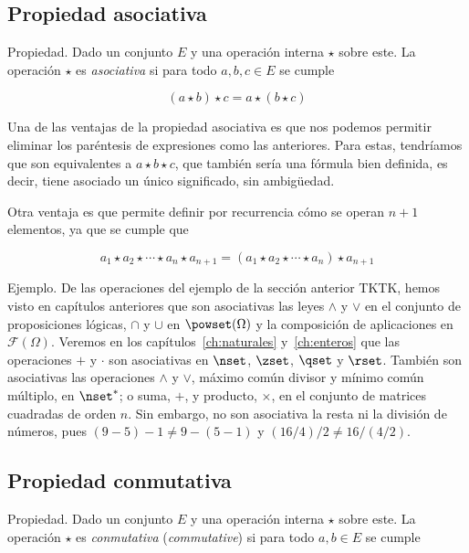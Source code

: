 





\subsection{Propiedad asociativa}

Propiedad. Dado un conjunto $E$ y una operación interna $\star$ sobre este.
La operación $\star$ es \emph{asociativa} si para todo $a, b, c \in E$ se
cumple

$$ (a \star b) \star c = a \star (b \star c) $$

Una de las ventajas de la propiedad asociativa es que nos podemos permitir
eliminar los paréntesis de expresiones como las anteriores. Para estas,
tendríamos que son equivalentes a $a \star b \star c$, que también sería una
fórmula bien definida, es decir, tiene asociado un único significado, sin
ambigüedad.

Otra ventaja es que permite definir por recurrencia cómo se operan $n + 1$
elementos, ya que se cumple que

$$ a_1 \star a_2 \star \cdots \star a_n \star a_{n+1} = (a_1 \star a_2 \star
\cdots \star a_n) \star a_{n+1} $$

Ejemplo. De las operaciones del ejemplo de la sección anterior TKTK, hemos
visto en capítulos anteriores que son asociativas las leyes $\land$ y $\lor$
en el conjunto de proposiciones lógicas, $\cap$ y $\cup$ en
$\powset(\Omega)$ y la composición de aplicaciones en $\mathcal{F}(\Omega)$.
Veremos en los capítulos~\ref{ch:naturales} y~\ref{ch:enteros} que las
operaciones $+$ y $\cdot$ son asociativas en $\nset$, $\zset$, $\qset$ y
$\rset$. También son asociativas las operaciones $\land$ y $\lor$, máximo
común divisor y mínimo común múltiplo, en $\nset^*$; o suma, $+$, y
producto, $\times$, en el conjunto de matrices cuadradas de orden $n$. Sin
embargo, no son asociativa la resta ni la división de números, pues $(9 - 5)
- 1 \neq 9 - (5 - 1)$ y $(16/4)/2 \neq 16/(4/2)$.




\subsection{Propiedad conmutativa}

Propiedad. Dado un conjunto $E$ y una operación interna $\star$ sobre este.
La operación $\star$ es \emph{conmutativa} (\emph{commutative}) si para todo
$a, b \in E$ se cumple

